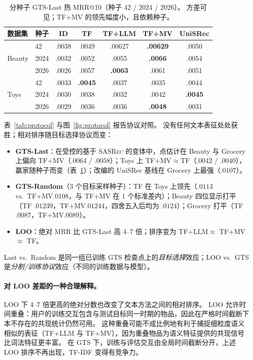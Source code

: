 \documentclass[sigconf,natbib=true,anonymous]{acmart}
\newcommand{\tfidf}{\textsc{TF-IDF}\xspace}
\newcommand{\tfllm}{\textsc{TF+LLM}\xspace}
\newcommand{\tfmv}{\textsc{TF+MV}\xspace}
\newcommand{\base}{\textsc{SASRec}\xspace}
\begin{document}
\begin{table}[t]
\centering
\caption{%
分种子 GTS-Last 热 MRR@10（种子 42 / 2024 / 2026）。
方差可见；\tfmv 的领先幅度小，且依赖种子。%
}
\label{tab:perseed}
\small
\setlength{\tabcolsep}{3pt}
\begin{tabular}{@{}llccccc@{}}
\toprule
数据集 & 种子 & ID & TF & TF+LLM & TF+MV & UniSRec \\
\midrule
\multirow{3}{*}{Beauty}
 & 42    & .0038 & .0049 & .00627 & \textbf{.00629} & .0050 \\
 & 2024  & .0032 & .0052 & .0055 & \textbf{.0066} & .0054 \\
 & 2026  & .0026 & .0057 & \textbf{.0063} & .0061 & .0051 \\
\midrule
\multirow{3}{*}{Toys}
 & 42    & .0033 & \textbf{.0045} & .0037 & .0035 & .0044 \\
 & 2024  & .0030 & .0038 & .0032 & .0042 & \textbf{.0045} \\
 & 2026  & .0029 & .0036 & .0036 & \textbf{.0048} & .0031 \\
\bottomrule
\end{tabular}
\end{table}

表~\ref{tab:protocol} 与图~\ref{fig:protocol} 报告协议对照。
没有任何文本表征处处获胜；相对排序随目标选择协议而变：

\begin{itemize}[leftmargin=*,itemsep=1pt]
\item \textbf{GTS-Last}：在受控的基于 \base 的变体中，点估计在 Beauty 与 Grocery 上偏向 \tfmv（$.0064$ / $.0058$）；Toys 上 TF+MV${}\approx{}$TF（$.0042$ / $.0040$），赢家随种子而变（表~\ref{tab:perseed}）；改编的 UniSRec 基线在 Grocery 上最强（$.0107$）。
\item \textbf{GTS-Random}（3 个目标采样种子）：TF 在 Toys 上领先（$.0113$ vs.\ \tfmv $.0108$，与 \tfmv 在 1 个标准差内）；Beauty 四位显示打平（TF $.01239$，\tfmv $.01244$，四舍五入后均为 $.0124$）；Grocery 打平（TF $.0087$，\tfmv $.0089$）。
\item \textbf{LOO}：绝对 MRR 比 GTS-Last 高 4--7 倍；排序变为 \tfllm $\approx$ \tfmv $\approx$ TF。
\end{itemize}
Last vs.\ Random 是同一组已训练 GTS 检查点上的\emph{目标选择}效应；LOO vs.\ GTS 是\emph{分割/训练协议}效应（不同的训练数据与模型）。

\paragraph{对 LOO 差距的一种合理解释。}
LOO 下 4--7 倍更高的绝对分数也改变了文本方法之间的相对排序。
LOO 允许时间重叠：用户的训练交互包含与测试目标同一时期的物品，因此在严格时间截断下本不存在的共现统计仍然可用。
这种重叠可能不成比例地有利于捕捉细粒度语义相似的表征（\tfllm 与 \tfmv），因为重叠物品为语义特征提供的共现信号比词法特征更丰富。
在 GTS 下，训练与评估交互由全局时间截断分开，上述 LOO 排序不再出现，\tfidf 变得有竞争力。
\end{document}
